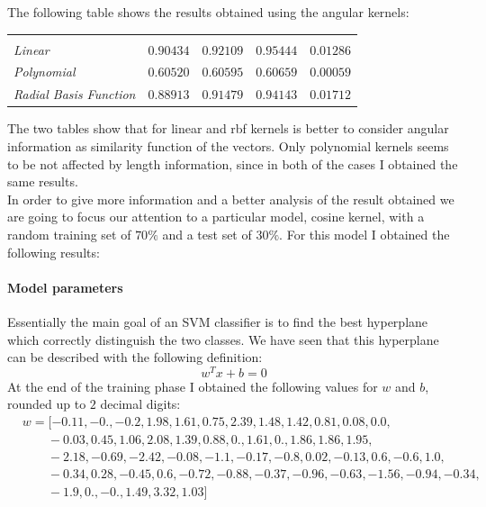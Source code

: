 \documentclass[11pt,a4paper]{article}
\begin{document}
The following table shows the results obtained using the angular kernels:\\
 

\begin{table}[!htbp]
	\begin{tabularx}{\linewidth}{|Y|l|l|l|l|}
		 &  &  &  & \\
		\centering \textit{Linear} & $0.90434$ & $0.92109$ & $0.95444$ & $0.01286$\\
		
		\centering \textit{Polynomial} & $0.60520$ & $0.60595$ & $0.60659$ & $0.00059$\\
		
		\centering \textit{Radial Basis Function} & $0.88913$ & $0.91479$ & $0.94143$ & $0.01712$\\
	\end{tabularx}%
\end{table}

The two tables show that for linear and rbf kernels is better to consider angular information as similarity function of the vectors. Only polynomial kernels seems to be not affected by length information, since in both of the cases I obtained the same results.\\

In order to give more information and a better analysis of the result obtained we are going to focus our attention to a particular model, cosine kernel, with a random training set of $70\%$ and a test set of $30\%$. For this model I obtained the following results:

\paragraph{Model parameters} Essentially the main goal of an SVM classifier is to find the best hyperplane which correctly distinguish the two classes. We have seen that this hyperplane can be described with the following definition:
$$ w^Tx + b = 0$$
At the end of the training phase I obtained the following values for $w$ and $b$, rounded up to $2$ decimal digits:
\begin{equation*}
\begin{split}
& w = [-0.11, -0., -0.2, 1.98, 1.61, 0.75, 2.39, 1.48, 1.42, 0.81, 0.08, 0.0,\\
& \qquad -0.03, 0.45, 1.06, 2.08, 1.39, 0.88, 0., 1.61, 0., 1.86, 1.86, 1.95,\\
& \qquad -2.18, -0.69, -2.42, -0.08, -1.1, -0.17, -0.8, 0.02, -0.13, 0.6, -0.6, 1.0,\\
& \qquad -0.34, 0.28, -0.45, 0.6, -0.72, -0.88, -0.37, -0.96, -0.63, -1.56, -0.94, -0.34,\\
& \qquad -1.9, 0., -0., 1.49, 3.32, 1.03]
\end{split}
\end{equation*}
\end{document}
